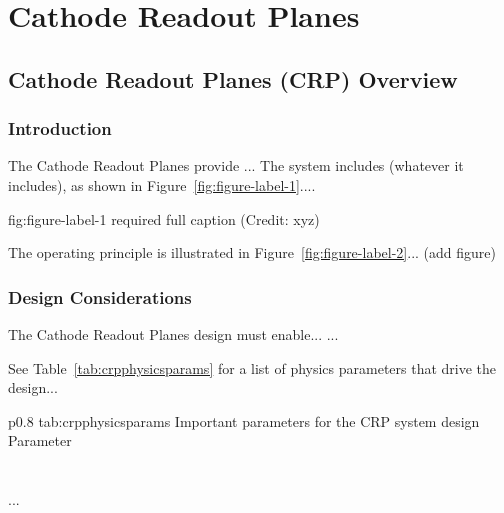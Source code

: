 \chapter{Cathode Readout Planes}
\label{ch:fddp-CRP}

\section{Cathode Readout Planes (CRP) Overview}
\label{sec:fddp-crp-ov}


\subsection{Introduction}
\label{sec:fddp-crp-intro}

The Cathode Readout Planes provide ...
The system includes (whatever it includes), as shown in Figure~\ref{fig:figure-label-1}.... 


\begin{dunefigure}{fig:figure-label-1}
{required full caption (Credit: xyz)}
\end{dunefigure}

The operating principle is illustrated in Figure~\ref{fig:figure-label-2}... (add figure)


\subsection{Design Considerations}
\label{sec:fddp-crp-des-consid}


The Cathode Readout Planes design must enable... 
...


See Table~\ref{tab:crpphysicsparams} for a list of physics parameters that drive the design...

\begin{dunetable}
{p{0.8\textwidth}}
{tab:crpphysicsparams}
{Important parameters for the CRP system design}   
Parameter \\ \toprowrule
  \\ \colhline
   \\ \colhline
 ...\\ 
\end{dunetable}

